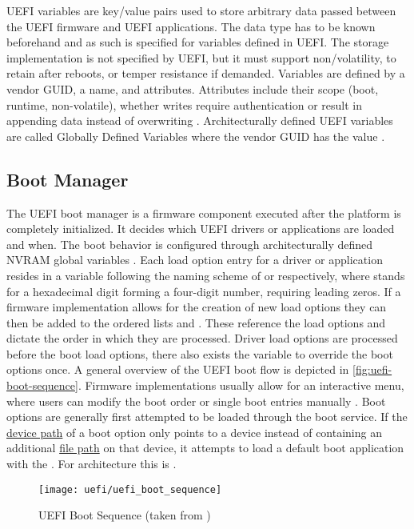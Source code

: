 \ac{UEFI} variables are key/value pairs used to store arbitrary data passed between the \ac{UEFI} firmware and \ac{UEFI} applications.
The data type has to be known beforehand and as such is specified for variables defined in \ac{UEFI}.
The storage implementation is not specified by \ac{UEFI}, but it must support non\-/volatility, to retain after reboots, or temper resistance if demanded.
Variables are defined by a vendor \ac{GUID}, a name, and attributes.
Attributes include their scope (boot, runtime, non-volatile), whether writes require authentication or result in appending data instead of overwriting \cite[Section 8.2]{uefi-spec}.
Architecturally defined \ac{UEFI} variables are called Globally Defined Variables where the vendor \ac{GUID} has the value  \cite[Section 3.3]{uefi-spec}.

\subsection{Boot Manager}
\label{sec:uefi-pi:uefi:boot-manager}

The \ac{UEFI} boot manager is a firmware component executed after the platform is completely initialized.
It decides which \ac{UEFI} drivers or applications are loaded and when.
The boot behavior is configured through architecturally defined \ac{NVRAM} global variables \cite[Section 3.1]{uefi-spec}.
Each load option entry for a driver or application resides in a variable following the naming scheme of  or  respectively, where \code{\#} stands for a hexadecimal digit forming a four-digit number, requiring leading zeros.
If a firmware implementation allows for the creation of new load options they can then be added to the ordered lists  and .
These reference the load options and dictate the order in which they are processed.
Driver load options are processed before the boot load options, there also exists the  variable to override the boot options once.
A general overview of the \ac{UEFI} boot flow is depicted in \autoref{fig:uefi-boot-sequence}.
Firmware implementations usually allow for an interactive menu, where users can modify the boot order or single boot entries manually \cite[Section 3.1.1]{uefi-spec}.
Boot options are generally first attempted to be loaded through the  boot service.
If the \hyperref[lst:device-path-protocol]{device path} of a boot option only points to a device instead of containing an additional \hyperref[lst:device-path-protocol]{file path} on that device, it attempts to load a default boot application with the  \cite[Section 3.1.2]{uefi-spec}.
For  architecture this is  \cite[Section 3.5]{uefi-spec}.

\begin{figure}[htb]%
    \centering%
    \texttt{[image: uefi/uefi\_boot\_sequence]}%
    \caption[\acs{UEFI} Boot Sequence]{\acs{UEFI} Boot Sequence (taken from \cite[Figure 2-1]{uefi-spec})}%
    \label{fig:uefi-boot-sequence}%
\end{figure}
